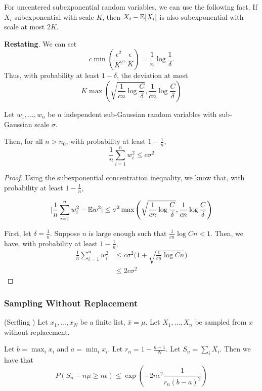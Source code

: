 For uncentered subexponential random variables, we can use the following fact. If $X_i$ subexponential with scale $K$, then $X_i - {\mathbb E}[X_i]$ is also subexponential with scale at most $2K$.

\textbf{Restating}. We can set
\[
c \min\left( \frac{\epsilon^2}{K^2}, \frac{\epsilon}{K} \right) = \frac{1}{n} \log \frac{1}{\delta}.
\]
Thus, with probability at least $1-\delta$, the deviation at most
\[
K \max\left( \sqrt{\frac{1}{cn} \log \frac{C}{\delta}},  \frac{1}{cn} \log \frac{C}{\delta} \right)
\]


\begin{corollary}
Let $w_1,...,w_n$ be $n$ independent sub-Gaussian random variables with sub-Gaussian scale $\sigma$. 

Then, for all $n > n_0$, with probability at least $1- \frac{1}{n}$,
\[
\frac{1}{n} \sum_{i=1}^n w_i^2 \leq c \sigma^2 
\]
\end{corollary}

\begin{proof}
Using the subexponential concentration inequality, we know that, with probability at least $1-\frac{1}{n}$, 

\[
| \frac{1}{n} \sum_{i=1}^n w_i^2 - {\mathbb E} w^2 | \leq \sigma^2 \max\left( \sqrt{\frac{1}{cn} \log \frac{C}{\delta}}, \frac{1}{cn}\log \frac{C}{\delta} \right)
\]

First, let $\delta = \frac{1}{n}$. Suppose $n$ is large enough such that $ \frac{1}{cn} \log Cn < 1$. Then, we have, with probability at least $1-\frac{1}{n}$,
\begin{align*}
 \frac{1}{n} \sum_{i=1}^n w_i^2 &\leq c\sigma^2 \Big(1+\sqrt{\frac{1}{cn} \log Cn}\Big) \\
		&\leq 2 c \sigma^2
 \end{align*}
 
\end{proof}



\subsubsection{Sampling Without Replacement}

\begin{lemma} (Serfling \cite{serfling1974probability}) 
Let $x_1,..., x_N$ be a finite list, $\bar{x} = \mu$. Let $X_1,...,X_n$ be sampled from $x$ without replacement. 

Let $b = \max_i x_i$ and $a = \min_i x_i$. Let $r_n = 1- \frac{n-1}{N}$. Let $S_n = \sum_i X_i$.
Then we have that
\[
P( S_n - n \mu \geq n \epsilon) \leq \exp( - 2 n \epsilon^2 \frac{1}{r_n (b-a)^2})
\]
\end{lemma}

